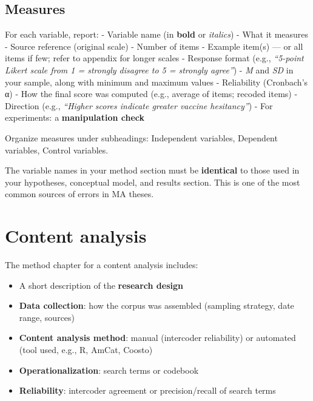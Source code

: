\documentclass[
  11pt,
  a4paper,
]{scrbook}
\providecommand{\tightlist}{%
  \setlength{\itemsep}{0pt}\setlength{\parskip}{0pt}}\usepackage{longtable,booktabs,array}
\begin{document}
\subsection{Measures}\label{measures}

For each variable, report: - Variable name (in \textbf{bold} or
\emph{italics}) - What it measures - Source reference (original scale) -
Number of items - Example item(s) --- or all items if few; refer to
appendix for longer scales - Response format (e.g., \emph{``5-point
Likert scale from 1 = strongly disagree to 5 = strongly agree''}) -
\emph{M} and \emph{SD} in your sample, along with minimum and maximum
values - Reliability (Cronbach's α) - How the final score was computed
(e.g., average of items; recoded items) - Direction (e.g.,
\emph{``Higher scores indicate greater vaccine hesitancy''}) - For
experiments: a \textbf{manipulation check}

Organize measures under subheadings: Independent variables, Dependent
variables, Control variables.

\begin{tcolorbox}[enhanced jigsaw, bottomrule=.15mm, opacityback=0, toprule=.15mm, colframe=quarto-callout-warning-color-frame, left=2mm, rightrule=.15mm, title=\textcolor{quarto-callout-warning-color}{\faExclamationTriangle}\hspace{0.5em}{Consistency is critical}, colbacktitle=quarto-callout-warning-color!10!white, bottomtitle=1mm, colback=white, breakable, toptitle=1mm, titlerule=0mm, leftrule=.75mm, arc=.35mm, opacitybacktitle=0.6, coltitle=black]

The variable names in your method section must be \textbf{identical} to
those used in your hypotheses, conceptual model, and results section.
This is one of the most common sources of errors in MA theses.

\end{tcolorbox}

\section{Content analysis}\label{content-analysis-1}

The method chapter for a content analysis includes:

\begin{itemize}
\tightlist
\item
  A short description of the \textbf{research design}
\item
  \textbf{Data collection}: how the corpus was assembled (sampling
  strategy, date range, sources)
\item
  \textbf{Content analysis method}: manual (intercoder reliability) or
  automated (tool used, e.g., R, AmCat, Coosto)
\item
  \textbf{Operationalization}: search terms or codebook
\item
  \textbf{Reliability}: intercoder agreement or precision/recall of
  search terms
\end{itemize}
\end{document}
